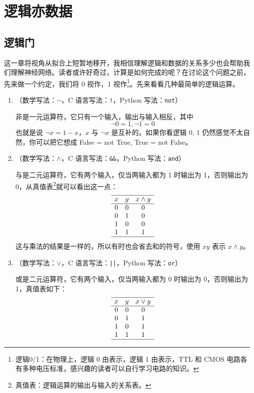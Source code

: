 \section{逻辑亦数据}
\subsection{逻辑门}

这一章将视角从拟合上短暂地移开，我相信理解逻辑和数据的关系多少也会帮助我们理解神经网络。读者或许好奇过，计算是如何完成的呢？在讨论这个问题之前，先来做一个约定，我们将 0 视作，1 视作\footnote{逻辑0/1：在物理上，逻辑 0 由表示，逻辑 1 由表示，TTL 和 CMOS 电路各有多种电压标准，感兴趣的读者可以自行学习电路的知识。}。先来看看几种最简单的逻辑运算。

\begin{enumerate}
    \item {}（数学写法：$\neg$，C 语言写法：\texttt{!}，Python 写法：\texttt{not}）
    
    非是一元运算符，它只有一个输入，输出与输入相反，其中
    \[
        \neg 0 = 1, \neg 1 = 0
    \]
    也就是说 $\neg x = 1 - x$，$x$ 与 $\neg x$ 是互补的。如果你看逻辑 0, 1 仍然感觉不太自然，你可以把它想成 False = not True, True = not False。

    \item {}（数学写法：$\land$，C 语言写法：\texttt{\&\&}，Python 写法：\texttt{and}）
    
    与是二元运算符，它有两个输入，仅当两输入都为 1 时输出为 1，否则输出为 0，从真值表\footnote{真值表：逻辑运算的输出与输入的关系表。}就可以看出这一点：
    \[
        \begin{array}{ccc}
            \hline
            x & y & x \land y \\
            \hline
            0 & 0 & 0 \\
            0 & 1 & 0 \\
            1 & 0 & 0 \\
            1 & 1 & 1 \\
            \hline
        \end{array}
    \]
    这与乘法的结果是一样的，所以有时也会省去和的符号，使用 $xy$ 表示 $x \land y$。
    
    \item {}（数学写法：$\lor$，C 语言写法：\texttt{||}，Python 写法：\texttt{or}）
    
    或是二元运算符，它有两个输入，仅当两输入都为 0 时输出为 0，否则输出为 1，真值表如下：
    \[
        \begin{array}{ccc}
            \hline
            x & y & x \lor y \\
            \hline
            0 & 0 & 0 \\
            0 & 1 & 1 \\
            1 & 0 & 1 \\
            1 & 1 & 1 \\
            \hline
        \end{array}
    \]
\end{enumerate}

